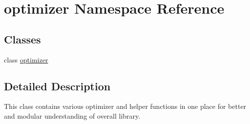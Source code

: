 \hypertarget{namespaceoptimizer}{}\section{optimizer Namespace Reference}
\label{namespaceoptimizer}
\subsection*{Classes}
\begin{DoxyCompactItemize}
\item 
class \hyperlink{classoptimizer_1_1optimizer}{optimizer}
\end{DoxyCompactItemize}


\subsection{Detailed Description}
\begin{DoxyVerb}This class contains various optimizer and helper functions in one place for better and modular understanding of overall 
library.
\end{DoxyVerb}
 